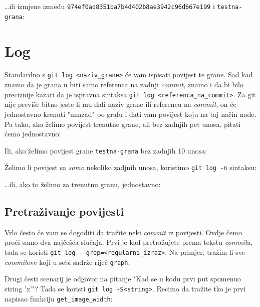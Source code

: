 \dots{}ili izmjene između \verb+974ef0ad8351ba7b4d402b8ae3942c96d667e199+ i \verb+testna-grana+:


\section*{Log}

Standardno s \verb+git log <naziv_grane>+ će vam ispisati povijest te grane.
Sad kad znamo da je grana u biti samo referenca na zadnji \emph{commit}, znamo i da bi bilo preciznije kazati da je ispravna sintaksa \verb+git log <referenca_na_commit>+.
Za git nije previše bitno jeste li mu dali naziv grane ili referencu na \emph{commit}, on će jednostavno krenuti "unazad" po grafu i dati vam povijest koju na taj način nađe.
Pa tako, ako želimo povijest trenutne grane, ali bez zadnjih pet unosa, pitati ćemo jednostavno:


Ili, ako želimo povijest grane \verb+testna-grana+ bez zadnjih 10 unosa:


Želimo li povijest sa \emph{samo} nekoliko zadjnih unosa, koristimo \verb+git log -n+ sintaksu:


\dots{}ili, ako to želimo za trenutnu granu, jednostavno:


\subsection*{Pretraživanje povijesti}

Vrlo često će vam se dogoditi da tražite neki \emph{commit} iz povijesti.
Ovdje ćemo proći samo dva najčešća slučaja.
Prvi je kad pretražujete prema tekstu \emph{commit}a, tada se koristi \verb+git log --grep=<regularni_izraz>+.
Na primjer, tražim li sve \emph{commit}ove koji u sebi sadrže riječ \verb+graph+:


Drugi česti scenarij je odgovor na pitanje "Kad se u kodu prvi put spomenuo string 'x'"? Tada se koristi \verb+git log -S<string>+.
Recimo da tražite tko je prvi napisao funkciju \verb+get_image_width+:

